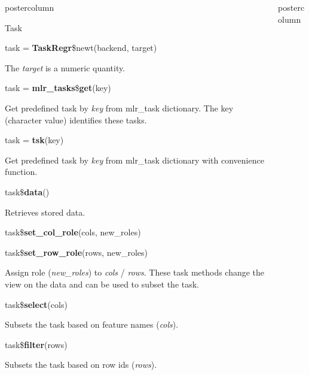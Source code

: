 \documentclass{beamer}
\begin{document}
\begin{frame}[fragile]{}
\begin{columns}
\begin{column}{.245\textwidth}
\begin{beamercolorbox}[center]{postercolumn}
\begin{minipage}{.98\textwidth}
{\begin{myblock}{Task}
						\begin{codebox}
							task = \textbf{TaskRegr}\$newt(backend, target)
						\end{codebox}
						The \textit{target} is a numeric quantity.
						\\
						\begin{codebox}
							task = \textbf{mlr\_tasks}\$\textbf{get}(key)
						\end{codebox}
						Get predefined task by \textit{key} from mlr\_task dictionary. The key (character value) identifies these tasks. 
						\\
						\begin{codebox}
							task = \textbf{tsk}(key)
						\end{codebox}
						Get predefined task by \textit{key} from mlr\_task dictionary with convenience function.
						\\
						\begin{codebox}
							task\$\textbf{data}()
						\end{codebox}
						Retrieves stored data.
						\\
						\begin{codebox}
							task\$\textbf{set\_col\_role}(cols, new\_roles)
						\end{codebox}
						\begin{codebox}
							task\$\textbf{set\_row\_role}(rows, new\_roles)
						\end{codebox}
						 Assign role (\textit{new\_roles}) to \textit{cols} / \textit{rows}. These task methods change the view on the data and can be used to subset the task.
						\\
						\begin{codebox}
							task\$\textbf{select}(cols)
						\end{codebox}
						Subsets the task based on feature names (\textit{cols}).
						\\
						\begin{codebox}
							task\$\textbf{filter}(rows)
						\end{codebox}
						Subsets the task based on row ids (\textit{rows}).
					\end{myblock}
					\vfill
				}
			\end{minipage}
		\end{beamercolorbox}
	\end{column}
	\begin{column}{.245\textwidth}
		\begin{beamercolorbox}[center]{postercolumn}

\end{beamercolorbox}
\end{column}
\end{columns}
\end{frame}
\end{document}
